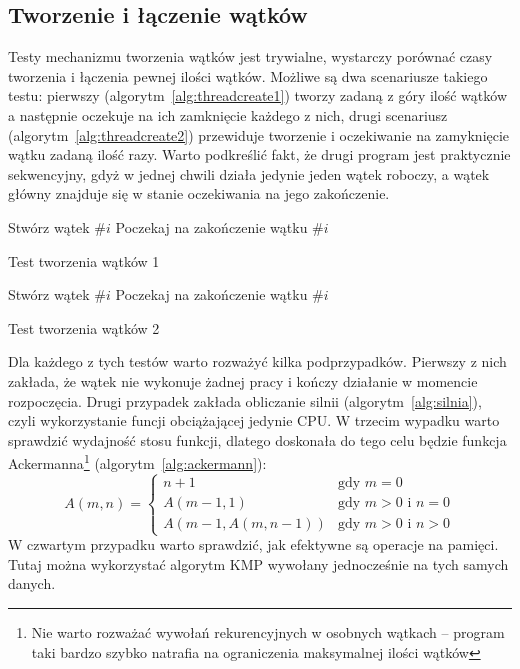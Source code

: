 \documentclass[prodmode]{acmsmall}
\begin{document}
\subsection{Tworzenie i łączenie wątków}
Testy mechanizmu tworzenia wątków jest trywialne, wystarczy porównać czasy tworzenia i łączenia pewnej ilości wątków. Możliwe są dwa scenariusze takiego testu: pierwszy (algorytm~\ref{alg:threadcreate1}) tworzy zadaną z góry ilość wątków a następnie oczekuje na ich zamknięcie każdego z nich, drugi scenariusz (algorytm~\ref{alg:threadcreate2}) przewiduje tworzenie i oczekiwanie na zamyknięcie wątku zadaną ilość razy. Warto podkreślić fakt, że drugi program jest praktycznie sekwencyjny, gdyż w jednej chwili działa jedynie jeden wątek roboczy, a wątek główny znajduje się w stanie oczekiwania na jego zakończenie.

\begin{algorithm}[t]
\SetAlgoNoLine
{}
 {
	Stwórz wątek \#$i$\;
}
 {
	Poczekaj na zakończenie wątku \#$i$\;
}
\caption{Test tworzenia wątków 1}
\label{alg:threadcreate1}
\end{algorithm}

\begin{algorithm}[t]
\SetAlgoNoLine
{}
 {
	Stwórz wątek \#$i$\;
	Poczekaj na zakończenie wątku \#$i$\;
}
\caption{Test tworzenia wątków 2}
\label{alg:threadcreate2}
\end{algorithm}

Dla każdego z tych testów warto rozważyć kilka podprzypadków. Pierwszy z nich zakłada, że wątek nie wykonuje żadnej pracy i kończy działanie w momencie rozpoczęcia. Drugi przypadek zakłada obliczanie silnii (algorytm~\ref{alg:silnia}), czyli wykorzystanie funcji obciążającej jedynie CPU. W trzecim wypadku warto sprawdzić wydajność stosu funkcji, dlatego doskonała do tego celu będzie funkcja Ackermanna\footnote{Nie warto rozważać wywołań rekurencyjnych w osobnych wątkach -- program taki bardzo szybko natrafia na ograniczenia maksymalnej ilości wątków} (algorytm~\ref{alg:ackermann}):
\[
	A(m,n) = \left\{
		\begin{array}{ll}
			n+1 & \textrm{gdy $m=0$}\\
			A(m-1, 1) & \textrm{gdy $m>0$ i $n=0$}\\
			A(m-1, A(m, n-1)) & \textrm{gdy $m>0$ i $n>0$} 
		\end{array}
	\right.
\]
W czwartym przypadku warto sprawdzić, jak efektywne są operacje na pamięci. Tutaj można wykorzystać algorytm KMP\cite{knuth:kmp} wywołany jednocześnie na tych samych danych.
\end{document}
